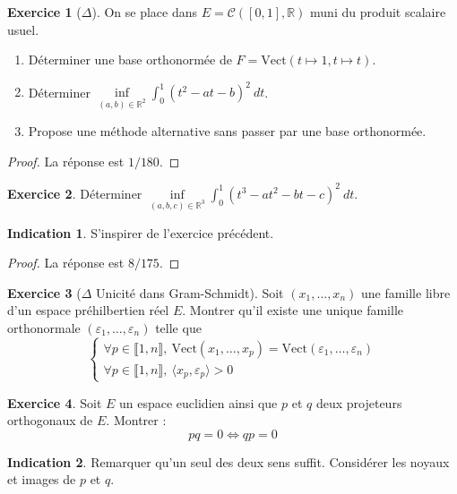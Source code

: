 \documentclass[french]{book}
\newcommand{\R}{\mathbb{R}}
\theoremstyle{definition}
\newtheorem{ex}{Exercice}[chapter]
\theoremstyle{theorem}
\newtheorem*{ind}{Indication}
\theoremstyle{remark}
\begin{document}
\begin{ex}[$\Delta$]
	On se place dans $E=\mathcal{C}([0,1],\R)$ muni du produit scalaire usuel.
	\begin{enumerate}
		\item Déterminer une base orthonormée de $F=\text{Vect}(t\mapsto 1,t\mapsto t)$.
		\item Déterminer $\displaystyle\underset{(a,b)\in\R^2}{\inf}\int_{0}^{1}(t^2-at-b)^2\ dt$.
		\item Propose une méthode alternative sans passer par une base orthonormée.
	\end{enumerate}
\end{ex}

\begin{proof}
	La réponse est $1/180$.
\end{proof}

\begin{ex}
	Déterminer $\displaystyle\underset{(a,b,c)\in\R^3}{\inf}\int_{0}^{1}(t^3-at^2-bt-c)^2\ dt$.
\end{ex}

\begin{ind}
	S'inspirer de l'exercice précédent.
\end{ind}

\begin{proof}
	La réponse est $8/175$.
\end{proof}

\begin{ex}[$\Delta$ Unicité dans Gram-Schmidt]
	Soit $(x_1,\ldots,x_n)$ une famille libre d'un espace préhilbertien réel $E$. Montrer qu'il existe une unique famille orthonormale $(\varepsilon_1,\ldots,\varepsilon_n)$ telle que $$\begin{cases}
		\forall p\in\llbracket 1,n\rrbracket,\ \text{Vect}(x_1,\ldots,x_p)=\text{Vect}(\varepsilon_1,\ldots,\varepsilon_n) \\
		\forall p\in\llbracket1,n\rrbracket,\ \langle x_p,\varepsilon_p\rangle>0
	\end{cases}$$
\end{ex}

\begin{ex}
	Soit $E$ un espace euclidien ainsi que $p$ et $q$ deux projeteurs orthogonaux de $E$. Montrer : $$pq=0\iff qp=0$$
\end{ex}

\begin{ind}
	Remarquer qu'un seul des deux sens suffit. Considérer les noyaux et images de $p$ et $q$.
\end{ind}
\end{document}
